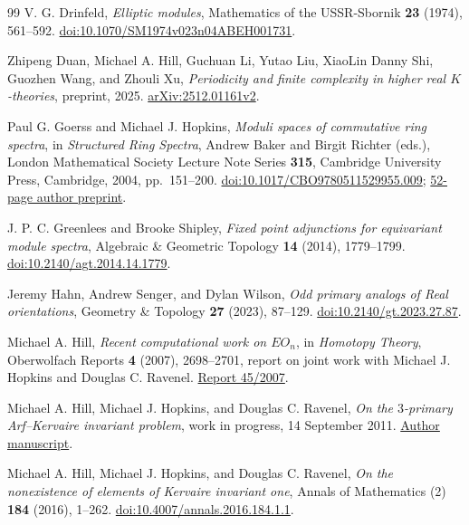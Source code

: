 \begin{thebibliography}{99}
V. G. Drinfeld,
\emph{Elliptic modules},
Mathematics of the USSR-Sbornik \textbf{23} (1974), 561--592.
\href{https://doi.org/10.1070/SM1974v023n04ABEH001731}{doi:10.1070/SM1974v023n04ABEH001731}.

Zhipeng Duan, Michael A. Hill, Guchuan Li, Yutao Liu,
XiaoLin Danny Shi, Guozhen Wang, and Zhouli Xu,
\emph{Periodicity and finite complexity in higher real $K$-theories},
preprint, 2025.
\href{https://arxiv.org/abs/2512.01161v2}{arXiv:2512.01161v2}.

Paul G. Goerss and Michael J. Hopkins,
\emph{Moduli spaces of commutative ring spectra},
in \emph{Structured Ring Spectra},
Andrew Baker and Birgit Richter (eds.),
London Mathematical Society Lecture Note Series \textbf{315},
Cambridge University Press, Cambridge, 2004, pp.~151--200.
\href{https://doi.org/10.1017/CBO9780511529955.009}{doi:10.1017/CBO9780511529955.009};
\href{https://www.sas.rochester.edu/mth/sites/doug-ravenel/otherpapers/sum.pdf}{52-page author preprint}.

J. P. C. Greenlees and Brooke Shipley,
\emph{Fixed point adjunctions for equivariant module spectra},
Algebraic \& Geometric Topology \textbf{14} (2014), 1779--1799.
\href{https://doi.org/10.2140/agt.2014.14.1779}{doi:10.2140/agt.2014.14.1779}.

Jeremy Hahn, Andrew Senger, and Dylan Wilson,
\emph{Odd primary analogs of Real orientations},
Geometry \& Topology \textbf{27} (2023), 87--129.
\href{https://doi.org/10.2140/gt.2023.27.87}{doi:10.2140/gt.2023.27.87}.

Michael A. Hill,
\emph{Recent computational work on $EO_n$},
in \emph{Homotopy Theory},
Oberwolfach Reports \textbf{4} (2007), 2698--2701,
report on joint work with Michael J. Hopkins and Douglas C. Ravenel.
\href{https://publications.mfo.de/bitstream/handle/mfo/3031/OWR_2007_45.pdf?isAllowed=y\&sequence=1}{Report 45/2007}.

Michael A. Hill, Michael J. Hopkins, and Douglas C. Ravenel,
\emph{On the $3$-primary Arf--Kervaire invariant problem},
work in progress, 14 September 2011.
\href{https://www.sas.rochester.edu/mth/sites/doug-ravenel/mypapers/odd.pdf}{Author manuscript}.

Michael A. Hill, Michael J. Hopkins, and Douglas C. Ravenel,
\emph{On the nonexistence of elements of Kervaire invariant one},
Annals of Mathematics (2) \textbf{184} (2016), 1--262.
\href{https://doi.org/10.4007/annals.2016.184.1.1}{doi:10.4007/annals.2016.184.1.1}.


\end{thebibliography}
